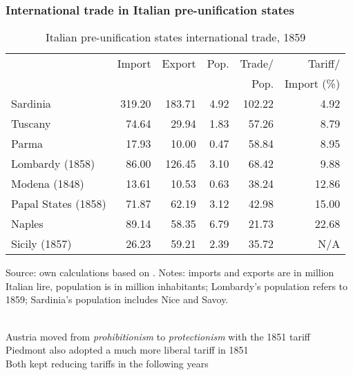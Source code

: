 \documentclass[10pt]{beamer}
\begin{document}
\begin{frame}[label = trade_comparison]
    \frametitle{International trade in Italian pre-unification states}

\begin{table}[htbp]
  \centering
  \caption{Italian pre-unification states international trade, 1859}
  \fontsize{8}{8}\selectfont
    \begin{tabular}{lrrrrr}
    \hline
      & Import & Export & Pop. & Trade/ & Tariff/ \\
      &  &  &  & Pop. & Import (\%) \\
    \hline
    Sardinia &            319.20    &            183.71    &            4.92    & 102.22 & 4.92 \\
    Tuscany &               74.64    &               29.94    &            1.83    & 57.26 & 8.79 \\
    Parma &               17.93    &               10.00    &            0.47    & 58.84 & 8.95 \\
    Lombardy (1858) &               86.00    &            126.45    & 3.10    & 68.42 & 9.88 \\
    Modena (1848) &               13.61    &               10.53    &            0.63    & 38.24 & 12.86 \\
    Papal States (1858) &               71.87    &               62.19    &            3.12    & 42.98 & 15.00 \\
    Naples &               89.14    &               58.35    &            6.79    & 21.73 & 22.68 \\
    Sicily (1857) &               26.23    &               59.21    &            2.39    & 35.72 &  N/A \\
    \hline
    \end{tabular}%

    Source: own calculations based on \cite[][pp. 138, 554]{cappellari1866}. Notes: imports and exports are in million Italian lire, population is in million inhabitants; Lombardy's population refers to 1859; Sardinia's population includes Nice and Savoy.

\end{table}%

\hyperlink{tariff_rates}{}  \\ 
\smallskip
Austria moved from \textit{prohibitionism} to \textit{protectionism} with the 1851 tariff  \\
\smallskip
Piedmont also adopted a much more liberal tariff in 1851 \\
\smallskip
Both kept reducing tariffs in the following years
   
\end{frame}
\end{document}
